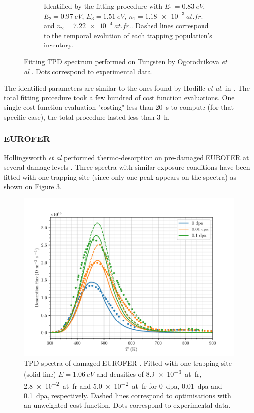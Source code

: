 \begin{figure} [ht]
\begin{subfigure}[t]{0.5\linewidth}
            \caption{Identified by the fitting procedure with $E_1 = \SI{0.83}{eV}$, $E_2 = \SI{0.97}{eV}$, $E_3 = \SI{1.51}{eV}$, $n_1 = \SI{1.18e-3}{at.fr.}$ and \newline $n_2 = \SI{7.22e-4}{at.fr.}$.  Dashed lines correspond to the temporal evolution of each trapping population's inventory.}
            \label{fig:5D TPD}
        \end{subfigure}%
    \caption{Fitting TPD spectrum performed on Tungsten by Ogorodnikova \textit{et  al} \cite{ogorodnikova_deuterium_2003}. Dots correspond to experimental data.}
    \label{fig:TPD ogorodnikova}
\end{figure}
The identified parameters are similar to the ones found by Hodille \textit{et al.} in \cite{hodille_macroscopic_2015}.
The total fitting procedure took a few hundred of cost function evaluations.
One single cost function evaluation "costing" less than \SI{20}{s} to compute (for that specific case), the total procedure lasted less than \SI{3}{h}.

\subsubsection{EUROFER}

Hollingsworth \textit{et al} performed thermo-desorption on pre-damaged EUROFER at several damage levels .
Three spectra with similar exposure conditions have been fitted with one trapping site (since only one peak appears on the spectra) as shown on Figure \ref{fig:TPD EUROFER}.

\begin{figure} [ht]
    \centering
    \includegraphics[width=\linewidth]{Figures/Chapter3/Parametric_optimisation/EUROFER_hollingsworth.pdf}
    \caption{TPD spectra of damaged EUROFER \cite{hollingsworth_comparative_2019}. Fitted with one trapping site (solid line) $E=\SI{1.06}{eV}$ and densities of \SI{8.9e-3}{at.fr}, \SI{2.8e-2}{at.fr} and \SI{5.0e-2}{at.fr} for \SI{0}{dpa}, \SI{0.01}{dpa} and \SI{0.1}{dpa}, respectively. Dashed lines correspond to optimisations with an unweighted cost function. Dots correspond to experimental data.}
    \label{fig:TPD EUROFER}
\end{figure}

